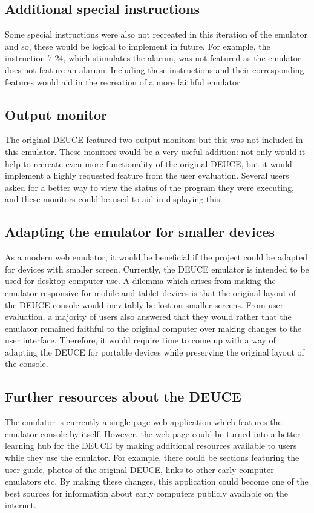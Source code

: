 \documentclass{l4proj}
\begin{document}
\subsection{Additional special instructions}
Some special instructions were also not recreated in this iteration of the emulator and so, these would be logical to implement in future. For example, the instruction 7-24, which stimulates the alarum, was not featured as the emulator does not feature an alarum. Including these instructions and their corresponding features would aid in the recreation of a more faithful emulator.

\subsection{Output monitor}
The original DEUCE featured two output monitors but this was not included in this emulator. These monitors would be a very useful addition: not only would it help to recreate even more functionality of the original DEUCE, but it would implement a highly requested feature from the user evaluation. Several users asked for a better way to view the status of the program they were executing, and these monitors could be used to aid in displaying this.

\subsection{Adapting the emulator for smaller devices}
As a modern web emulator, it would be beneficial if the project could be adapted for devices with smaller screen. Currently, the DEUCE emulator is intended to be used for desktop computer use. A dilemma which arises from making the emulator responsive for mobile and tablet devices is that the original layout of the DEUCE console would inevitably be lost on smaller screens. From user evaluation, a majority of users also answered that they would rather that the emulator remained faithful to the original computer over making changes to the user interface. Therefore, it would require time to come up with a way of adapting the DEUCE for portable devices while preserving the original layout of the console.

\subsection{Further resources about the DEUCE}
The emulator is currently a single page web application which features the emulator console by itself. However, the web page could be turned into a better learning hub for the DEUCE by making additional resources available to users while they use the emulator. For example, there could be sections featuring the user guide, photos of the original DEUCE, links to other early computer emulators etc. By making these changes, this application could become one of the best sources for information about early computers publicly available on the internet. 
\end{document}
